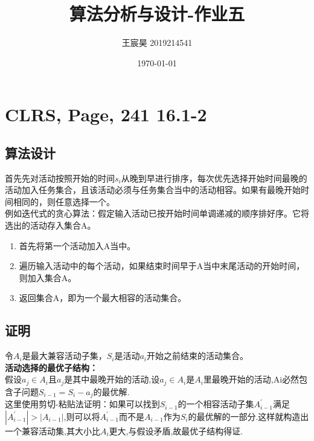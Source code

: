 \documentclass[UTF8]{ctexart}
\title{算法分析与设计-作业五}
\author{王宸昊 2019214541}
\date{\today}
\begin{document}
\maketitle


\section{CLRS, Page, 241 16.1-2}

\subsection{算法设计}
首先先对活动按照开始的时间$s_i$从晚到早进行排序，每次优先选择开始时间最晚的活动加入任务集合，且该活动必须与任务集合当中的活动相容。如果有最晚开始时间相同的，则任意选择一个。\\
例如迭代式的贪心算法：假定输入活动已按开始时间单调递减的顺序排好序。它将选出的活动存入集合A。
\begin{enumerate}[1.]

    \item 首先将第一个活动加入A当中。
    \item 遍历输入活动中的每个活动，如果结束时间早于A当中末尾活动的开始时间，则加入集合A。
    \item 返回集合A，即为一个最大相容的活动集合。
    
\end{enumerate}

\subsection{证明}
令$A_i$是最大兼容活动子集，$S_i$是活动$a_i$开始之前结束的活动集合。\\

\textbf{活动选择的最优子结构：}\\
假设$a_j \in A_i$且$a_j$是其中最晚开始的活动,设$a_j \in A_i$是$A_i$里最晚开始的活动,A{i}必然包含子问题$S_{i-1}=S_{i}-{a_j}$的最优解.\\
这里使用剪切-粘贴法证明：如果可以找到$S_{i-1}$的一个相容活动子集$A^\prime_{i-1}$满足$|A^\prime_{i-1}|>|A_{i-1}|$,则可以将$A^\prime_{i-1}$而不是$A_{i-1}$作为$S_i$的最优解的一部分.这样就构造出一个兼容活动集,其大小比$A_i$更大,与假设矛盾,故最优子结构得证.\\
\end{document}
